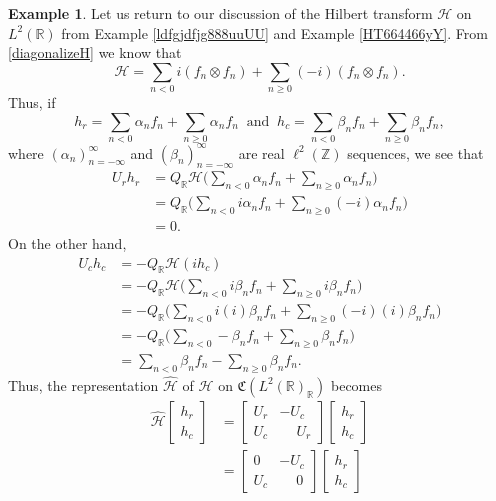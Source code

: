 \documentclass{dis}
\newcommand{\phm}{\phantom{-}}
\theoremstyle{plain}
\theoremstyle{definition}
\newtheorem{Example}[equation]{Example}
\def\R{\mathbb{R}}
\def\Z{\mathbb{Z}}
\renewcommand{\geq}{\geqslant}
\newcommand{\0}{{\color{lightgray}0}}
\begin{document}
\begin{Example}\label{hhhhtranspp6}
Let us return to our discussion of  the Hilbert transform $\mathscr{H}$ on $L^2(\R)$ from Example \ref{ldfgjdfjg888uuUU} and Example \ref{HT664466yY}. From \eqref{diagonalizeH} we know that 
$$\mathscr{H} = \sum_{n < 0} i (f_n \otimes f_n) + \sum_{n \geq 0} (-i) (f_n \otimes f_n).$$ Thus, if 
$$h_{r} = \sum_{n < 0} \alpha_{n} f_n + \sum_{n \geq 0} \alpha_n f_n \; \; \mbox{and} \; \; 
h_{c} = \sum_{n < 0} \beta_{n} f_n + \sum_{n \geq 0} \beta_n f_n,$$
where $(\alpha_{n})_{n = -\infty}^{\infty}$ and $(\beta_n)_{n = - \infty}^{\infty}$ are real $\ell^2(\Z)$ sequences, 
we see that 
\begin{align*}
U_{r} h_{r} & = Q_{\R} \mathscr{H} \Big(\sum_{n < 0} \alpha_{n} f_n + \sum_{n \geq 0} \alpha_n f_n\Big)\\
& = Q_{\R} \Big(\sum_{n < 0} i \alpha_{n} f_n + \sum_{n \geq 0}(-i) \alpha_n f_n\Big)\\
& = 0.
\end{align*}
On the other hand, 
\begin{align*}
U_{c} h_{c} & = -Q_{\R} \mathscr{H}(i h_c)\\
& = - Q_{\R} \mathscr{H} \Big(\sum_{n < 0} i \beta_{n} f_n + \sum_{n \geq 0} i \beta_n f_n\Big)\\
& = -  Q_{\R} \Big(\sum_{n < 0} i (i) \beta_{n} f_n + \sum_{n \geq 0}(-i)  (i)\beta_n f_n\Big)\\
& = -Q_{\R} \Big(\sum_{n < 0} - \beta_n f_n + \sum_{n \geq 0} \beta_n f_n\Big)\\
& = \sum_{n < 0} \beta_n f_n - \sum_{n \geq 0} \beta_n f_n.
\end{align*}
Thus, the representation $\widehat{\mathscr{H}}$ of $\mathscr{H}$ on $\mathfrak{C}(L^2(\R)_{\R})$ becomes 
\begin{align*}
\widehat{\mathscr{H}} \begin{bmatrix} h_r\\ h_c\end{bmatrix} & = \begin{bmatrix} U_{r} & - U_{c}\\ U_{c} & \phm U_{r}\end{bmatrix} \begin{bmatrix} h_r\\ h_c\end{bmatrix}\\
& = \begin{bmatrix} 0 & - U_{c}\\ U_{c} & \phm 0 \end{bmatrix} \begin{bmatrix} h_r\\ h_c\end{bmatrix}\\

\end{align*}
\end{Example}
\end{document}
